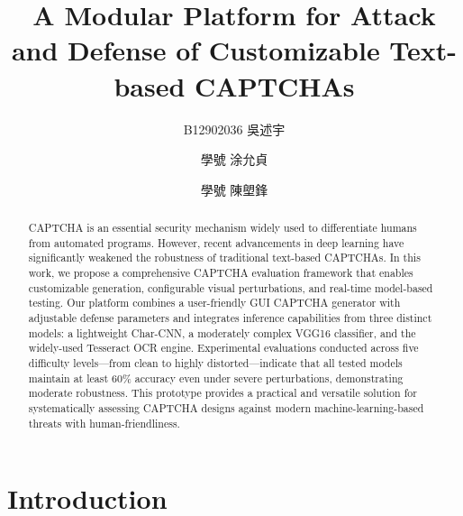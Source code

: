 \documentclass[
  a4paper,
  oneside,         %
  UKenglish,       %
  cleveref,        %
  autoref,         %
  thm-restate      %
]{lipics-v2021}
\title{A Modular Platform for Attack and Defense of Customizable Text-based CAPTCHAs}
\author{B12902036 吳述宇 \and {學號} 涂允貞 \and {學號} 陳塱鋒}{2025 Spring CNS}{}{}{}
\begin{document}
\maketitle

\begin{abstract}
CAPTCHA is an essential security mechanism widely used to differentiate humans from automated programs. However, recent advancements in deep learning have significantly weakened the robustness of traditional text-based CAPTCHAs. In this work, we propose a comprehensive CAPTCHA evaluation framework that enables customizable generation, configurable visual perturbations, and real-time model-based testing. Our platform combines a user-friendly GUI CAPTCHA generator with adjustable defense parameters and integrates inference capabilities from three distinct models: a lightweight Char-CNN, a moderately complex VGG16 classifier, and the widely-used Tesseract OCR engine. Experimental evaluations conducted across five difficulty levels—from clean to highly distorted—indicate that all tested models maintain at least 60\% accuracy even under severe perturbations, demonstrating moderate robustness. This prototype provides a practical and versatile solution for systematically assessing CAPTCHA designs against modern machine-learning-based threats with human-friendliness.
\end{abstract}

\section{Introduction}
\label{sec:typesetting-summary}
\end{document}
